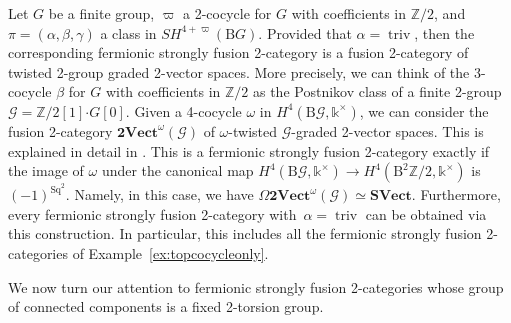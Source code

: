 \documentclass[10pt,a4paper]{amsart}
\numberwithin{equation}{section}
\begin{document}
\begin{Example}\label{ex:lin2group}
Let $G$ be a finite group, $\varpi$ a 2-cocycle for $G$ with coefficients in $\mathbb{Z}/2$, and $\pi=(\alpha,\beta,\gamma)$ a class in $SH^{4+\varpi}(\mathrm{B}G)$. Provided that $\alpha=\operatorname{triv}$, then the corresponding fermionic strongly fusion 2-category is a fusion 2-category of twisted 2-group graded 2-vector spaces. More precisely, we can think of the 3-cocycle $\beta$ for $G$ with coefficients in $\mathbb{Z}/2$ as the Postnikov class of a finite 2-group $\mathcal{G}=\mathbb{Z}/2[1]\boldsymbol{\cdot}G[0]$. Given a 4-cocycle $\omega$ in $H^4(\mathrm{B}\mathcal{G},\mathds{k}^{\times})$, we can consider the fusion 2-category $\mathbf{2Vect}^{\omega}(\mathcal{G})$ of $\omega$-twisted $\mathcal{G}$-graded 2-vector spaces. This is explained in detail in \cite[Construction 2.1.16]{DR}. This is a fermionic strongly fusion 2-category exactly if the image of $\omega$ under the canonical map $H^4(\mathrm{B}\mathcal{G},\mathds{k}^{\times})\rightarrow H^4(\mathrm{B}^2\mathbb{Z}/2,\mathds{k}^{\times})$ is $(-1)^{\mathrm{Sq}^2}$. Namely, in this case, we have $\Omega\mathbf{2Vect}^{\omega}(\mathcal{G})\simeq\mathbf{SVect}$. Furthermore, every fermionic strongly fusion 2-category with~${\alpha=\operatorname{triv}}$ can be obtained via this construction. In particular, this includes all the fermionic strongly fusion 2-categories of Example~\ref{ex:topcocycleonly}.
\end{Example}

We now turn our attention to fermionic strongly fusion 2-categories whose group of connected components is a fixed 2-torsion group.
\end{document}
